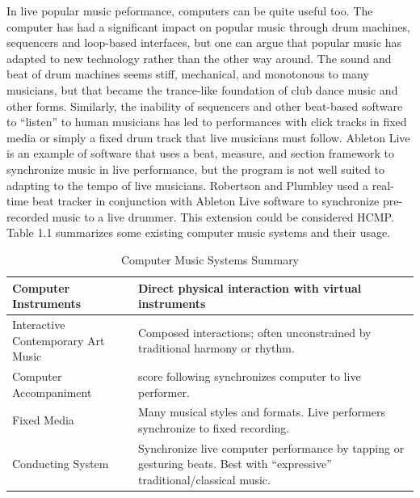 In live popular music peformance, computers can be quite useful too.
The computer has had a significant
impact on popular music through drum machines, sequencers and loop-based
interfaces, but one can argue that popular music has adapted to new technology
rather than the other way around. The sound and beat of drum machines seems stiff,
mechanical, and monotonous to many musicians, but that became the trance-like
foundation of club dance music and other forms. Similarly, 
the inability of
sequencers and other beat-based software to “listen” to human musicians has led to
performances with click tracks in fixed media or simply a fixed drum track that live
musicians must follow. Ableton Live \cite{Ableton:2011} is an example of software that
uses a beat, measure, and section framework to synchronize music in live
performance, but the program is not well suited to adapting to the tempo of live
musicians. Robertson and Plumbley \cite{Robertson:2007} used a real-time beat 
tracker in
conjunction with Ableton Live software to synchronize pre-recorded music 
to a live drummer. This extension could be considered HCMP.
Table 1.1 summarizes some existing computer music systems and their usage.

\begin{table}[htdp]
\centering
\begin{tabular}{| p{5cm} | p{8cm} |} %

\hline
Computer Instruments & Direct physical interaction with virtual instruments \\

\hline 
Interactive Contemporary Art Music & Composed interactions; often unconstrained by
traditional harmony or rhythm.\\

\hline
Computer Accompaniment & score following synchronizes computer to live performer.\\

\hline
Fixed Media  & Many musical styles and formats. Live performers
synchronize to fixed recording.\\

\hline
Conducting System & Synchronize live computer performance by tapping or
gesturing beats. Best with “expressive”
traditional/classical music.\\
\hline
\end{tabular}
\caption[Computer Music Systems Summary]{Computer Music Systems Summary}
\label{latexin_genes} %
\end{table}

